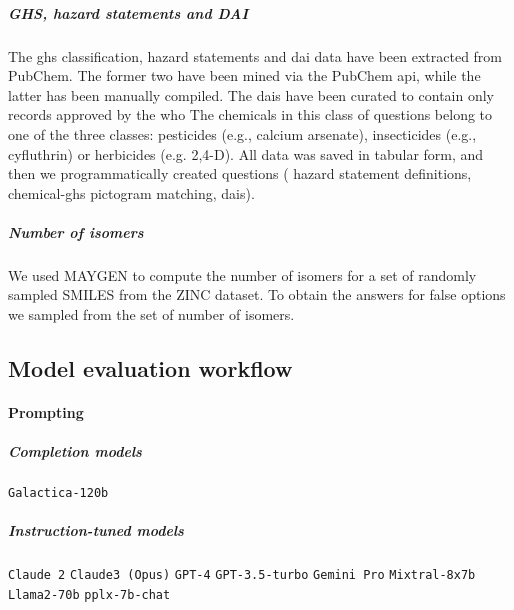 \documentclass[11pt, oneside]{article}
\begin{document}
\subparagraph{GHS, hazard statements and DAI}
The \gls{ghs} classification, hazard statements and  \gls{dai} data have been extracted from PubChem. \cite{pubchem}
The former two have been mined via the PubChem \gls{api}, while the latter has been manually compiled.
The \glspl{dai} have been curated to contain only records approved by the \gls{who} 
The chemicals in this class of questions belong to one of the three classes: pesticides (e.g., calcium arsenate), insecticides (e.g., cyfluthrin) or herbicides (e.g. 2,4-D). 
All data was saved in tabular form, and then we programmatically created questions ( hazard statement definitions,  chemical-\gls{ghs} pictogram matching,  \glspl{dai}).


\subparagraph{Number of isomers}
We used MAYGEN\cite{Yirik_2021} to compute the number of isomers for a set of randomly sampled SMILES from the ZINC dataset.
To obtain the answers for false options we sampled from the set of number of isomers.

\subsection{Model evaluation workflow}

\paragraph{Prompting}

\subparagraph{Completion models}
\texttt{Galactica-120b}\cite{taylor2022galactica}


\subparagraph{Instruction-tuned models} \texttt{Claude 2} \texttt{Claude3 (Opus)}\cite{anthropicClaudeModelFamily2024}
\texttt{GPT-4}\cite{openai2024gpt4}
\texttt{GPT-3.5-turbo}\cite{brown2020language}
\texttt{Gemini Pro}\cite{gemini}
\texttt{Mixtral-8x7b}\cite{jiang2024mixtral}
\texttt{Llama2-70b}\cite{touvron2023llama}
\texttt{pplx-7b-chat}
\end{document}
